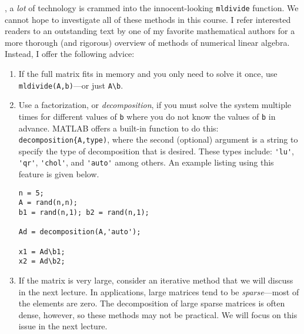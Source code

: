 , a \emph{lot} of technology is crammed into the innocent-looking \lstinline[style=myMatlab]{mldivide} function.  We cannot hope to investigate all of these methods in this course.  I refer interested readers to an outstanding text by one of my favorite mathematical authors for a more thorough (and rigorous) overview of methods of numerical linear algebra.\cite{trefethen2022numerical}  Instead, I offer the following advice:
\begin{enumerate}
\item If the full matrix fits in memory and you only need to solve it once, use \lstinline[style=myMatlab]{mldivide(A,b)}---or just \lstinline[style=myMatlab]{A\b}.
\item Use a factorization, or \emph{decomposition}, if you must solve the system multiple times for different values of \lstinline[style=myMatlab]{b} where you do not know the values of \lstinline[style=myMatlab]{b} in advance. MATLAB offers a built-in function to do this: \lstinline[style=myMatlab]{decomposition{A,type)}, where the second (optional) argument is a string to specify the type of decomposition that is desired.  These types include: \lstinline[style=myMatlab]{'lu'}, \lstinline[style=myMatlab]{'qr'}, \lstinline[style=myMatlab]{'chol'}, and \lstinline[style=myMatlab]{'auto'} among others. 
An example listing using this feature is given below.
\begin{lstlisting}[style=myMatlab]
n = 5;
A = rand(n,n);
b1 = rand(n,1); b2 = rand(n,1);

Ad = decomposition(A,'auto');

x1 = Ad\b1;
x2 = Ad\b2;
\end{lstlisting}

\item If the matrix is very large, consider an iterative method that we will discuss in the next lecture.  In applications, large matrices tend to be \emph{sparse}---most of the elements are zero. The decomposition of large sparse matrices is often dense, however, so these methods may not be practical.  We will focus on this issue in the next lecture. 

\end{enumerate}

